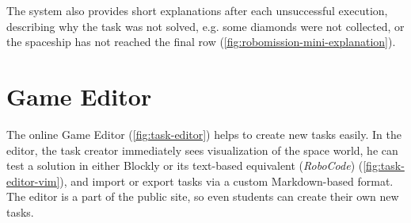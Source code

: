 
The system also provides short explanations after each unsuccessful execution,
describing why the task was not solved,
e.g. some diamonds were not collected,
or the spaceship has not reached the final row
(\cref{fig:robomission-mini-explanation}).


\section{Game Editor}  %
\label{sec:robomission.task-editor}

The online Game Editor (\cref{fig:task-editor})
helps to create new tasks easily.
In the editor, the task creator immediately sees visualization of the space world,
he can test a solution in either Blockly or its text-based equivalent (\emph{RoboCode})
(\cref{fig:task-editor-vim}),
and import or export tasks via a custom Markdown-based format.
The editor is a part of the public site, so even students can create their own new tasks.

